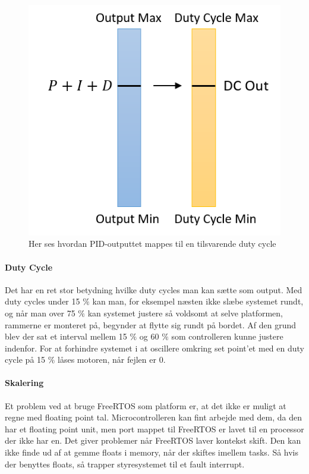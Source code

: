 \begin{figure}
	\begin{center}
	\includegraphics[scale=0.8]{Billeder/Mapping.png}
	\end{center}		
	\caption{Her ses hvordan PID-outputtet mappes til en tilsvarende duty cycle}
	\label{fig:Mapping}	
\end{figure}
\paragraph{Duty Cycle}

Det har en ret stor betydning hvilke duty cycles man kan sætte som output. Med duty cycles under 15 $\%$ kan man, for eksempel næsten ikke slæbe systemet rundt, og når man over 75 $\%$ kan systemet justere så voldsomt at selve platformen, rammerne er monteret på, begynder at flytte sig rundt på bordet. Af den grund blev der sat et interval mellem 15 $\%$ og 60 $\%$ som controlleren kunne justere indenfor. For at forhindre systemet i at oscillere omkring set point'et med en duty cycle på 15 $\%$ låses motoren, når fejlen er 0.

\paragraph{Skalering}

Et problem ved at bruge FreeRTOS som platform er, at det ikke er muligt at regne med floating point tal. Microcontrolleren kan fint arbejde med dem, da den har et floating point unit, men port mappet til FreeRTOS er lavet til en processor der ikke har en. Det giver problemer når FreeRTOS laver kontekst skift. Den kan ikke finde ud af at gemme floats i memory, når der skiftes imellem tasks. Så hvis der benyttes floats, så trapper styresystemet til et fault interrupt.

